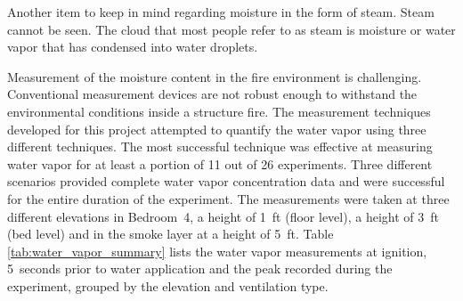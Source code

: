 \documentclass[12pt,oneside]{book}
\begin{document}
Another item to keep in mind regarding moisture in the form of steam.  Steam cannot be seen.  The cloud that most people refer to as steam is moisture or water vapor that has condensed into water droplets.   

Measurement of the moisture content in the fire environment is challenging. Conventional measurement devices are not robust enough to withstand the environmental conditions inside a structure fire. The measurement techniques developed for this project attempted to quantify the water vapor using three different techniques. The most successful technique was effective at measuring water vapor for at least a portion of 11 out of 26 experiments. Three different scenarios provided complete water vapor concentration data and were successful for the entire duration of the experiment. The measurements were taken at three different elevations in Bedroom~4, a height of 1~ft (floor level), a height of 3~ft (bed level) and in the smoke layer at a height of 5~ft. Table \ref{tab:water_vapor_summary} lists the water vapor measurements at ignition, 5~seconds prior to water application and the peak recorded during the experiment, grouped by the elevation and ventilation type.
\end{document}
